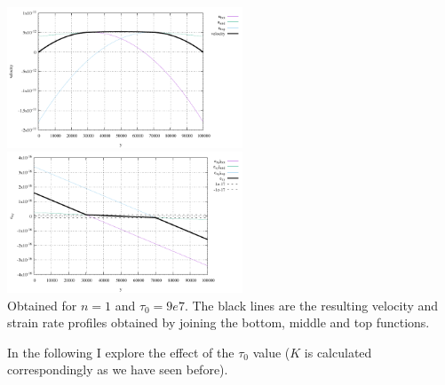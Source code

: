 \begin{center}
\includegraphics[width=7cm]{images/mms/channel_hb/velocity}
\includegraphics[width=7cm]{images/mms/channel_hb/exy}\\
{\captionfont Obtained for $n=1$ and $\tau_0=9e7$. The black lines are the resulting velocity and strain rate profiles obtained by joining the bottom, middle and top functions.}
\end{center}

In the following I explore the effect of the $\tau_0$ value ($K$ is calculated correspondingly as we have seen before).

